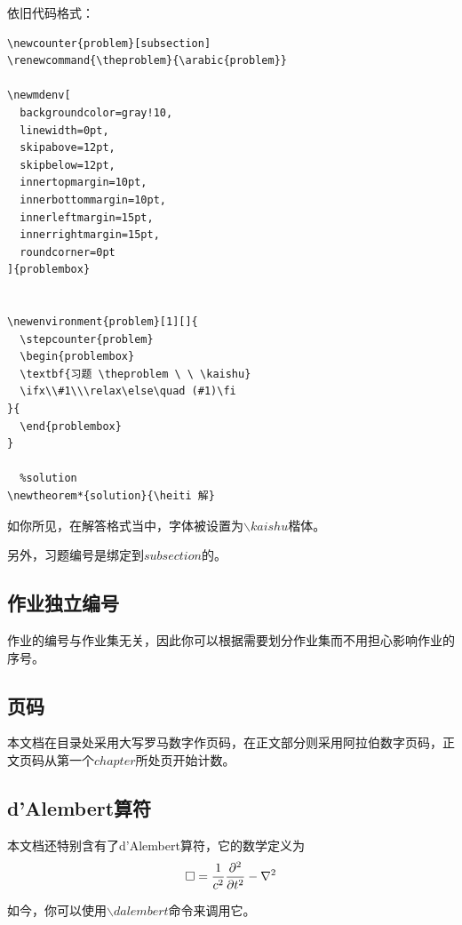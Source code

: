 \documentclass{template}
\begin{document}
\begin{solution}
    依旧代码格式：
    \begin{lstlisting}[title=\ ,frame=single]
  %problem
\newcounter{problem}[subsection]
\renewcommand{\theproblem}{\arabic{problem}}

\newmdenv[
  backgroundcolor=gray!10, 
  linewidth=0pt,
  skipabove=12pt,
  skipbelow=12pt, 
  innertopmargin=10pt,
  innerbottommargin=10pt,
  innerleftmargin=15pt,
  innerrightmargin=15pt,
  roundcorner=0pt
]{problembox} 


\newenvironment{problem}[1][]{
  \stepcounter{problem}
  \begin{problembox}
  \textbf{习题 \theproblem \ \ \kaishu}
  \ifx\\#1\\\relax\else\quad (#1)\fi
}{
  \end{problembox}
}

  %solution
\newtheorem*{solution}{\heiti 解}
    \end{lstlisting}
\end{solution}

如你所见，在解答格式当中，字体被设置为$\backslash kaishu$楷体。

另外，习题编号是绑定到$subsection$的。
\subsection{作业独立编号}
作业的编号与作业集无关，因此你可以根据需要划分作业集而不用担心影响作业的序号。
\subsection{页码}
本文档在目录处采用大写罗马数字作页码，在正文部分则采用阿拉伯数字页码，正文页码从第一个$chapter$所处页开始计数。
\subsection{d'Alembert算符}
本文档还特别含有了d'Alembert算符，它的数学定义为
\[\mathop{}\!\square=\frac{1}{c^2}\frac{\partial^2}{\partial t^2}-\nabla^2\]

如今，你可以使用$\backslash dalembert$命令来调用它。
\end{document}
